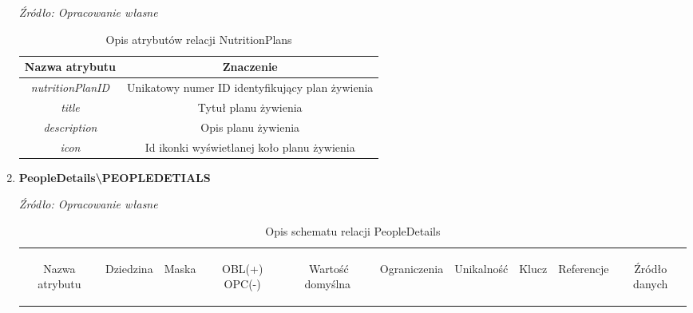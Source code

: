 \documentclass[12pt,oneside]{report}
\begin{document}
\begin{enumerate}[start=10,label={\bfseries REL\textbackslash\arabic*}]
	\begin{table}[H]
		\caption{Opis atrybutów relacji NutritionPlans}
		\textit{Źródło: Opracowanie własne}
		\label{NutritionPlansAttributeDescription}
		\centering
		\begin{tabular}{|c|c|}
			\hline
			Nazwa atrybutu & Znaczenie \\
			\hline			
			\textit{nutritionPlanID}& Unikatowy numer ID identyfikujący plan żywienia\\	
			\hline			
			\textit{title}&Tytuł planu żywienia\\	
			\hline			
			\textit{description}&Opis planu żywienia\\	
			\hline			
			\textit{icon}&Id ikonki wyświetlanej koło planu żywienia\\	
			\hline
		\end{tabular}
	\end{table}
\newpage
	\item \textbf{PeopleDetails\textbackslash PEOPLEDETIALS}
	 \begin{table}[H]
		\caption{Opis schematu relacji PeopleDetails}
		\textit{Źródło: Opracowanie własne}
		\label{PeopleDetailsRelationSchema}
		\centering
		\begin{tabular}{|c|c|c|c|c|c|c|c|c|c|}
			\hline
			\begin{sideways}Nazwa atrybutu\end{sideways}& 
			\begin{sideways}Dziedzina \end{sideways}& 
			\begin{sideways}Maska \end{sideways}& 
			\begin{sideways}OBL(+) OPC(-)\end{sideways} & 
			\begin{sideways}Wartość domyślna$\ $\end{sideways}& 
			\begin{sideways}Ograniczenia\end{sideways} &
			\begin{sideways}Unikalność \end{sideways}& 
			\begin{sideways}Klucz \end{sideways}& 
			\begin{sideways}Referencje \end{sideways}&
			\begin{sideways}Źródło danych\end{sideways}\\

\end{tabular}
\end{table}
\end{enumerate}
\end{document}

